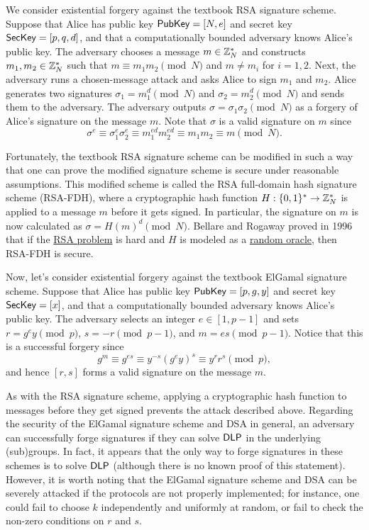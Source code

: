 \begin{exmp}
    We consider existential forgery against the textbook RSA signature scheme.
    Suppose that Alice has public key ${\sf PubKey} = [N, e]$ and secret key 
    ${\sf SecKey} = [p, q, d]$, and that a computationally bounded adversary 
    knows Alice's public key. The adversary chooses a message $m \in \mathbb{Z}_N^*$ 
    and constructs $m_1, m_2 \in \mathbb{Z}_N^*$ such that $m \equiv m_1 m_2 \pmod N$
    and $m \neq m_i$ for $i = 1, 2$. Next, the adversary runs a chosen-message 
    attack and asks Alice to sign $m_1$ and $m_2$. Alice generates two signatures 
    $\sigma_1 = m_1^d \pmod N$ and $\sigma_2 = m_2^d \pmod N$ and sends them to 
    the adversary. The adversary outputs $\sigma = \sigma_1 \sigma_2 \pmod N$ 
    as a forgery of Alice's signature on the message $m$. Note that $\sigma$ 
    is a valid signature on $m$ since 
    \[ \sigma^e \equiv \sigma_1^e \sigma_2^e \equiv m_1^{ed} m_2^{ed} 
    \equiv m_1 m_2 \equiv m \pmod N. \] 
\end{exmp}

Fortunately, the textbook RSA signature scheme can be modified in such a way 
that one can prove the modified signature scheme is secure under reasonable 
assumptions. This modified scheme is called the RSA full-domain hash signature 
scheme (RSA-FDH), where a cryptographic hash function $H : \{0, 1\}^* 
\to \mathbb{Z}_N^*$ is applied to a message $m$ before it gets signed. In particular, 
the signature on $m$ is now calculated as $\sigma = H(m)^d \pmod N$. 
Bellare and Rogaway \cite{10.1007/3-540-68339-9_34} proved in 1996 that if the 
\href{https://en.wikipedia.org/wiki/RSA_problem}{RSA problem} is hard and 
$H$ is modeled as a \href{https://en.wikipedia.org/wiki/Random_oracle}{random 
oracle}, then RSA-FDH is secure. 

\begin{exmp}
    Now, let's consider existential forgery against the textbook ElGamal signature 
    scheme. Suppose that Alice has public key ${\sf PubKey} = [p, g, y]$ and 
    secret key ${\sf SecKey} = [x]$, and that a computationally bounded adversary 
    knows Alice's public key. The adversary selects an integer $e \in [1, p-1]$ 
    and sets $r = g^e y \pmod p$, $s = -r \pmod{p-1}$, and $m = es \pmod{p-1}$. 
    Notice that this is a successful forgery since 
    \[ g^m \equiv g^{es} \equiv y^{-s}(g^e y)^s \equiv y^r r^s \pmod p, \] 
    and hence $[r, s]$ forms a valid signature on the message $m$. 
\end{exmp}

As with the RSA signature scheme, applying a cryptographic hash function to messages 
before they get signed prevents the attack described above. Regarding the security 
of the ElGamal signature scheme and DSA in general, an adversary can successfully 
forge signatures if they can solve ${\sf DLP}$ in the underlying (sub)groups. In fact, 
it appears that the only way to forge signatures in these schemes is to solve 
${\sf DLP}$ (although there is no known proof of this statement). However, it is 
worth noting that the ElGamal signature scheme and DSA can be severely attacked 
if the protocols are not properly implemented; for instance, one could fail 
to choose $k$ independently and uniformly at random, or fail to check the
non-zero conditions on $r$ and $s$. 